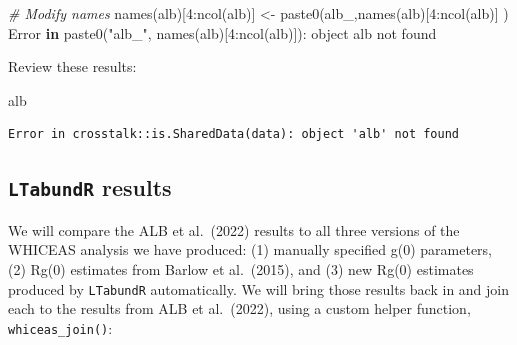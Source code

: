 \documentclass[
]{book}
\newenvironment{Shaded}{\begin{snugshade}}{\end{snugshade}}
\newcommand{\CommentTok}[1]{\textcolor[rgb]{0.56,0.35,0.01}{\textit{#1}}}
\newcommand{\ControlFlowTok}[1]{\textcolor[rgb]{0.13,0.29,0.53}{\textbf{#1}}}
\newcommand{\DecValTok}[1]{\textcolor[rgb]{0.00,0.00,0.81}{#1}}
\newcommand{\FunctionTok}[1]{\textcolor[rgb]{0.00,0.00,0.00}{#1}}
\newcommand{\NormalTok}[1]{#1}
\newcommand{\OtherTok}[1]{\textcolor[rgb]{0.56,0.35,0.01}{#1}}
\newcommand{\SpecialCharTok}[1]{\textcolor[rgb]{0.00,0.00,0.00}{#1}}
\newcommand{\StringTok}[1]{\textcolor[rgb]{0.31,0.60,0.02}{#1}}
\begin{document}
\begin{Shaded}
\begin{Highlighting}[]
\CommentTok{\# Modify names}
\FunctionTok{names}\NormalTok{(alb)[}\DecValTok{4}\SpecialCharTok{:}\FunctionTok{ncol}\NormalTok{(alb)] }\OtherTok{\textless{}{-}} \FunctionTok{paste0}\NormalTok{(}\StringTok{\textquotesingle{}alb\_\textquotesingle{}}\NormalTok{,}\FunctionTok{names}\NormalTok{(alb)[}\DecValTok{4}\SpecialCharTok{:}\FunctionTok{ncol}\NormalTok{(alb)] )}
\NormalTok{Error }\ControlFlowTok{in} \FunctionTok{paste0}\NormalTok{(}\StringTok{"alb\_"}\NormalTok{, }\FunctionTok{names}\NormalTok{(alb)[}\DecValTok{4}\SpecialCharTok{:}\FunctionTok{ncol}\NormalTok{(alb)])}\SpecialCharTok{:}\NormalTok{ object }\StringTok{\textquotesingle{}alb\textquotesingle{}}\NormalTok{ not found}
\end{Highlighting}
\end{Shaded}

Review these results:

\begin{Shaded}
\begin{Highlighting}[]
\NormalTok{alb}
\end{Highlighting}
\end{Shaded}

\begin{verbatim}
Error in crosstalk::is.SharedData(data): object 'alb' not found
\end{verbatim}

\hypertarget{ltabundr-results}{%
\subsection*{\texorpdfstring{\texttt{LTabundR} results}{LTabundR results}}\label{ltabundr-results}}

We will compare the ALB et al.~(2022) results to all three versions of the WHICEAS analysis we have produced: (1) manually specified g(0) parameters, (2) Rg(0) estimates from Barlow et al.~(2015), and (3) new Rg(0) estimates produced by \texttt{LTabundR} automatically. We will bring those results back in and join each to the results from ALB et al.~(2022), using a custom helper function, \texttt{whiceas\_join()}:
\end{document}
